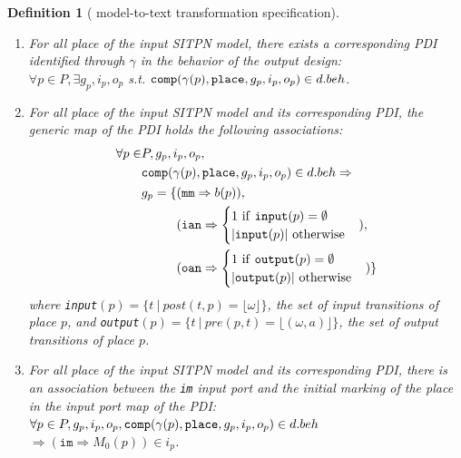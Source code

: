 \documentclass[pdflatex,sn-mathphys]{sn-jnl}%
\theoremstyle{thmstyleone}%
\theoremstyle{thmstyletwo}%
\theoremstyle{thmstylethree}%
\newtheorem{definition}{Definition}%
\begin{document}
\begin{definition}[\hilecop{} model-to-text transformation specification]
  \bigskip
  
  \begin{enumerate}[resume]
  \item\label{it:pdi-exists} For all place of the input SITPN model,
    there exists a corresponding PDI identified through $\gamma$ in
    the behavior of the output
    design:\\
    $\forall{}p\in{}P,\exists{}g_p,i_p,o_p$ s.t.  $\mathtt{comp}(\gamma(p),\mathtt{place},g_p,i_p,o_p)\in{}d.beh$.
    
  \item\label{it:pdi-gmap} For all place of the input SITPN model and
    its corresponding PDI, the generic map of the PDI holds the
    following associations:
    \begin{equation*}
      \begin{aligned}
        \forall{}p\in&{}P,g_p,i_p,o_p, \\
        & \mathtt{comp}(\gamma(p),\mathtt{place},g_p,i_p,o_p)\in{}d.beh\Rightarrow \\
        &
          \begin{aligned}
            g_p=\{&(\mathtt{mm}\Rightarrow{}b(p)), \\
                  & (\mathtt{ian}\Rightarrow
                    \begin{cases}
                      1~\mathrm{if}~\mathtt{input}(p)=\emptyset \\
                      \vert{}\mathtt{input}(p)\vert~\mathrm{otherwise} \\
                    \end{cases}), \\
                  &(\mathtt{oan}\Rightarrow
                    \begin{cases}
                      1~\mathrm{if}~\mathtt{output}(p)=\emptyset \\
                      \vert{}\mathtt{output}(p)\vert~\mathrm{otherwise} \\
                    \end{cases})\} \\
          \end{aligned} \\
      \end{aligned}
    \end{equation*}
    where
    \texttt{input}$(p)=\{t~\vert~post(t,p)=\lfloor\omega\rfloor\}$,
    the set of input transitions of place $p$, and
    \texttt{output}$(p)=\{t~\vert~pre(p,t)=\lfloor(\omega,a)\rfloor\}$,
    the set of output transitions of place $p$.
    
  \item\label{it:pdi-im} For all place of the input SITPN model and
    its corresponding PDI, there is an association between the
    \texttt{im} input port and the initial marking of the place in the
    input port map of the PDI:\\
    $\forall{}p\in{}P,g_p,i_p,o_p,\mathtt{comp}(\gamma(p),\mathtt{place},g_p,i_p,o_p)\in{}d.beh{}$
    $\Rightarrow(\mathtt{im}\Rightarrow{}M_0(p))\in{}i_p$.
  \end{enumerate}


\end{definition}
\end{document}
